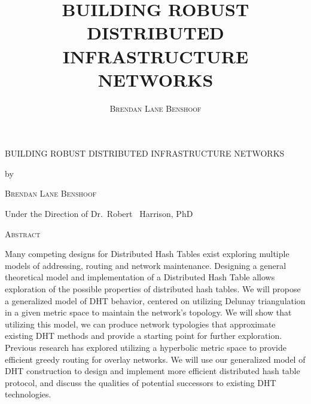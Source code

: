 \documentclass[12pt,letterpaper]{report}
\title{\textsc{BUILDING ROBUST DISTRIBUTED INFRASTRUCTURE NETWORKS}}
\author{\textsc{Brendan Lane Benshoof}}
\date{}
\begin{document}
	

	
	\begin{center}
		{\scshape BUILDING ROBUST DISTRIBUTED INFRASTRUCTURE NETWORKS\par}
		\vspace{0.5cm}
		{by\par}
		\vspace{0.5cm}
		{\scshape Brendan Lane Benshoof\par}
		\vspace{0.5cm}
		{Under the Direction of Dr.~Robert ~Harrison, PhD \par}
		\vspace{0.5cm}
		{\scshape Abstract \par}
		
	\end{center}
Many competing designs for Distributed Hash Tables exist exploring multiple models of addressing, routing and network maintenance. Designing a general theoretical model and implementation of a Distributed Hash Table allows exploration of the possible properties of distributed hash tables. We will propose a generalized model of DHT behavior, centered on utilizing Delunay triangulation in a given metric space to maintain the network’s topology. We will show that utilizing this model, we can produce network typologies that approximate existing DHT methods and provide a starting point for further exploration.
Previous research has explored utilizing a hyperbolic metric space to provide efficient greedy routing for overlay networks. We will use our generalized model of DHT construction to design and implement more efficient distributed hash table protocol, and discuss the qualities of potential successors to existing DHT technologies.
	
	\vfill
	
	

	
	
\end{document}
